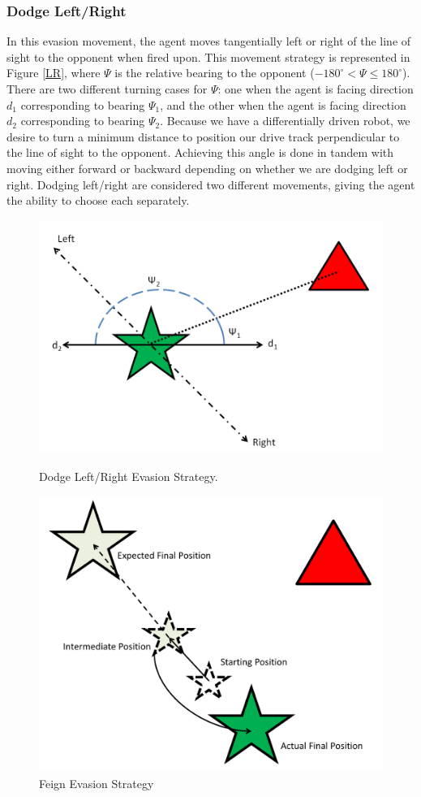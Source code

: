 \documentclass{article}
\theoremstyle{plain}
\theoremstyle{definition}
\theoremstyle{remark}
\begin{document}
\subsubsection*{Dodge Left/Right}
In this evasion movement, the agent moves tangentially left or right of the line of sight to the opponent when fired upon. This movement strategy is represented in Figure \ref{LR}, where $\Psi$ is the relative bearing to the opponent ($-180^{\circ} < \Psi \leq 180^{\circ}$). There are two different turning cases for $\Psi$: one when the agent is facing direction $d_1$ corresponding to bearing $\Psi_1$, and the other when the agent is facing direction $d_2$ corresponding to bearing $\Psi_2$. Because we have a differentially driven robot, we desire to turn a minimum distance to position our drive track perpendicular to the line of sight to the opponent. Achieving this angle is done in tandem with moving either forward or backward depending on whether we are dodging left or right. Dodging left/right are considered two different movements, giving the agent the ability to choose each separately.

\begin{figure}[t]
\begin{minipage}[b]{0.5\linewidth}
	\centering
		\includegraphics[width=6 cm]{LR}
	\caption{Dodge Left/Right Evasion Strategy.}
	\label{LR}
\end{minipage}
\hspace{0.5cm}
\begin{minipage}[b]{0.5\linewidth}
	\centering
		\includegraphics[width=6 cm]{Feign.png}
	\caption{Feign Evasion Strategy}
	\label{feign}
\end{minipage}
\end{figure}
\end{document}
